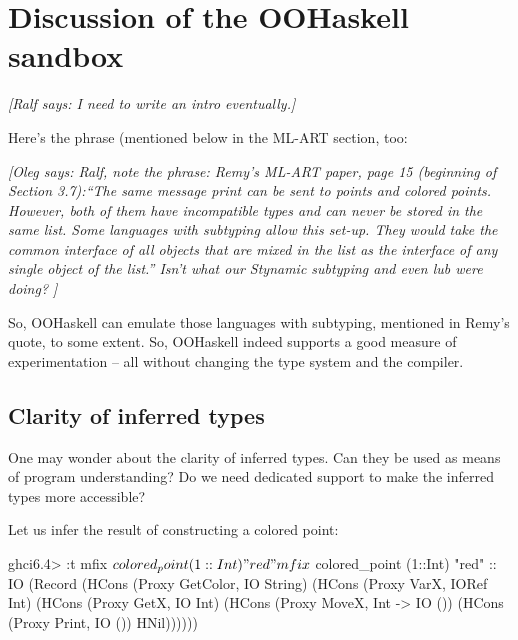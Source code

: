 \documentclass{jfp}
\newcommand{\oleg}[1]{{\it [Oleg says: #1]}}
\newcommand{\ralf}[1]{{\it [Ralf says: #1]}}
\begin{document}



\section{Discussion of the OOHaskell sandbox}
\label{S:discuss}


\ralf{I need to write an intro eventually.}

Here's the phrase (mentioned below in the ML-ART section, too:

\oleg{Ralf, note the phrase: Remy's ML-ART paper, page 15
(beginning of Section 3.7):``The same message print can be sent to
  points and colored points. However, both of them have incompatible
  types and can never be stored in the same list. Some languages with
  subtyping allow this set-up. They would take the common interface
  of all objects that are mixed in the list as the interface of any
  single object of the list.''
  Isn't what our Stynamic subtyping and even lub were doing?
}

So, OOHaskell can emulate those languages with subtyping, mentioned in
Remy's quote, to some extent. So, OOHaskell indeed supports a good
measure of experimentation -- all without changing the type system and
the compiler.





\subsection{Clarity of inferred types}

One may wonder about the clarity of inferred types. Can they be used
as means of program understanding? Do we need dedicated support to
make the inferred types more accessible?

Let us infer the result of constructing a colored point:
 
\begin{code}
 ghci6.4> :t mfix $ colored_point (1::Int) "red"
 mfix $ colored_point (1::Int) "red" ::
        IO (Record 
            (HCons (Proxy GetColor, IO String)
             (HCons (Proxy VarX, IORef Int)
              (HCons (Proxy GetX, IO Int)
               (HCons (Proxy MoveX, Int -> IO ())
                (HCons (Proxy Print, IO ())
                 HNil))))))
\end{code} 
\end{document}
